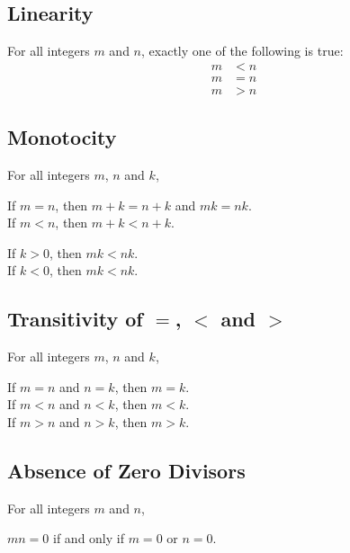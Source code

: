\documentclass[../notes.tex]{subfiles}
\begin{document}
			\subsection{Linearity}
				For all integers $m$ and $n$, exactly one of the following is true:
				\begin{align*}
					m &< n\\
					m &= n\\
					m &> n
				\end{align*}
			\subsection{Monotocity}
				For all integers $m$, $n$ and $k$,
				\begin{indentparagraph}
					If $m = n$, then $m + k = n + k$ and $mk = nk$.\\
					If $m < n$, then $m + k < n + k$.
					\begin{indentparagraph}
						If $k > 0$, then $mk < nk$.\\
						If $k < 0$, then $mk < nk$.
					\end{indentparagraph}
				\end{indentparagraph}
			\subsection{Transitivity of \texorpdfstring{$=$}{=}, \texorpdfstring{$<$}{<} and \texorpdfstring{$>$}{>}}
				For all integers $m$, $n$ and $k$,
				\begin{indentparagraph}
					If $m = n$ and $n = k$, then $m = k$.\\
					If $m < n$ and $n < k$, then $m < k$.\\
					If $m > n$ and $n > k$, then $m > k$.
				\end{indentparagraph}
			\subsection{Absence of Zero Divisors}
				For all integers $m$ and $n$,
				\begin{indentparagraph}
					$mn = 0$ if and only if $m = 0$ or $n = 0$.
				\end{indentparagraph}
\end{document}
